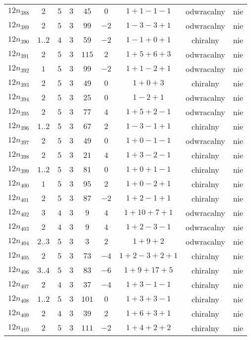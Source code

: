 \begin{longtable}{ccccccccc}
$12n_{388}$ & $2$ & $5$ & $3$ & $45$ & $0$ & $1+1-1-1$ & odwracalny & nie \\
$12n_{389}$ & $2$ & $5$ & $3$ & $99$ & $-2$ & $1-3-3+1$ & odwracalny & nie \\
$12n_{390}$ & $1..2$ & $4$ & $3$ & $59$ & $-2$ & $1-1+0+1$ & chiralny & nie \\
$12n_{391}$ & $2$ & $5$ & $3$ & $115$ & $2$ & $1+5+6+3$ & odwracalny & nie \\
$12n_{392}$ & $1$ & $5$ & $3$ & $99$ & $-2$ & $1+1-2+1$ & odwracalny & nie \\
$12n_{393}$ & $2$ & $5$ & $3$ & $49$ & $0$ & $1+0+3$ & chiralny & nie \\
$12n_{394}$ & $2$ & $5$ & $3$ & $25$ & $0$ & $1-2+1$ & odwracalny & nie \\
$12n_{395}$ & $2$ & $5$ & $3$ & $77$ & $4$ & $1+5+2-1$ & odwracalny & nie \\
$12n_{396}$ & $1..2$ & $5$ & $3$ & $67$ & $2$ & $1-3-1+1$ & chiralny & nie \\
$12n_{397}$ & $2$ & $5$ & $3$ & $49$ & $0$ & $1+0-1-1$ & odwracalny & nie \\
$12n_{398}$ & $2$ & $5$ & $3$ & $21$ & $4$ & $1+3-2-1$ & chiralny & nie \\
$12n_{399}$ & $1..2$ & $5$ & $3$ & $81$ & $0$ & $1+0+1-1$ & chiralny & nie \\
$12n_{400}$ & $1$ & $5$ & $3$ & $95$ & $2$ & $1+0-2+1$ & chiralny & nie \\
$12n_{401}$ & $2$ & $5$ & $3$ & $87$ & $-2$ & $1+2-1+1$ & chiralny & nie \\
$12n_{402}$ & $3$ & $4$ & $3$ & $9$ & $4$ & $1+10+7+1$ & odwracalny & nie \\
$12n_{403}$ & $2$ & $4$ & $3$ & $9$ & $4$ & $1+2-3-1$ & odwracalny & nie \\
$12n_{404}$ & $2..3$ & $5$ & $3$ & $3$ & $2$ & $1+9+2$ & odwracalny & nie \\
$12n_{405}$ & $2$ & $5$ & $3$ & $73$ & $-4$ & $1+2-3+2+1$ & chiralny & nie \\
$12n_{406}$ & $3..4$ & $5$ & $3$ & $83$ & $-6$ & $1+9+17+5$ & chiralny & nie \\
$12n_{407}$ & $2$ & $4$ & $3$ & $37$ & $-4$ & $1+3-1-1$ & chiralny & nie \\
$12n_{408}$ & $1..2$ & $5$ & $3$ & $101$ & $0$ & $1+3+3-1$ & chiralny & nie \\
$12n_{409}$ & $2$ & $4$ & $3$ & $39$ & $2$ & $1+6+3+1$ & chiralny & nie \\
$12n_{410}$ & $2$ & $5$ & $3$ & $111$ & $-2$ & $1+4+2+2$ & chiralny & nie \\

\end{longtable}
